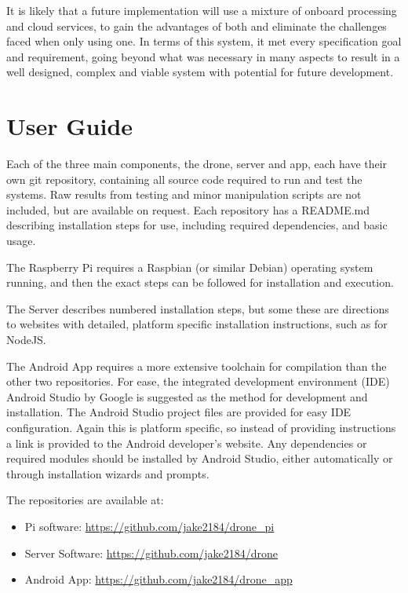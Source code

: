 \documentclass{article}
\begin{document}
It is likely that a future implementation will use a mixture of onboard processing and cloud services, to gain the advantages of both and eliminate the challenges faced when only using one. In terms of this system, it met every specification goal and requirement, going beyond what was necessary in many aspects to result in a well designed, complex and viable system with potential for future development.



\section{User Guide}\label{UserGuide}
Each of the three main components, the drone, server and app, each have their own git repository, containing all source code required to run and test the systems. Raw results from testing and minor manipulation scripts are not included, but are available on request. Each repository has a README.md describing installation steps for use, including required dependencies, and basic usage. 

The Raspberry Pi requires a Raspbian (or similar Debian) operating system running, and then the exact steps can be followed for installation and execution.

The Server describes numbered installation steps, but some these are directions to websites with detailed, platform specific installation instructions, such as for NodeJS.

The Android App requires a more extensive toolchain for compilation than the other two repositories. For ease, the integrated development environment (IDE) Android Studio by Google is suggested as the method for development and installation. The Android Studio project files are provided for easy IDE configuration. Again this is platform specific, so instead of providing instructions a link is provided to the Android developer's website. Any dependencies or required modules should be installed by Android Studio, either automatically or through installation wizards and prompts. 


The repositories are available at: 
\begin{itemize}
	\item Pi software: \url{https://github.com/jake2184/drone_pi}
	\item Server Software: \url{https://github.com/jake2184/drone}
	\item Android App: \url{https://github.com/jake2184/drone_app}
\end{itemize}
\end{document}
